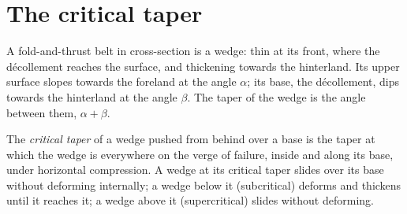\begin{omfigure}
\par{}\label{fig:b3:orogenic-wedges:duplex}
\end{omfigure}


\section{The critical taper}\label{sec:b3:orogenic-wedges:taper}

A fold-and-thrust belt in cross-section is a wedge: thin at its front, where
the décollement reaches the surface, and thickening towards the hinterland.
Its upper surface slopes towards the foreland at the angle $\alpha$; its
base, the décollement, dips towards the hinterland at the angle $\beta$. The
taper of the wedge is the angle between them, $\alpha + \beta$.

\begin{definition}\label{def:b3:orogenic-wedges:critical-taper}
The \emph{critical taper} of a wedge pushed from behind
over a base is the taper at which the wedge is everywhere on the verge of
failure, inside and along its base, under horizontal compression. A wedge at
its critical taper slides over its base without deforming internally; a
wedge below it (subcritical) deforms and thickens until it reaches it; a
wedge above it (supercritical) slides without deforming.
\end{definition}

